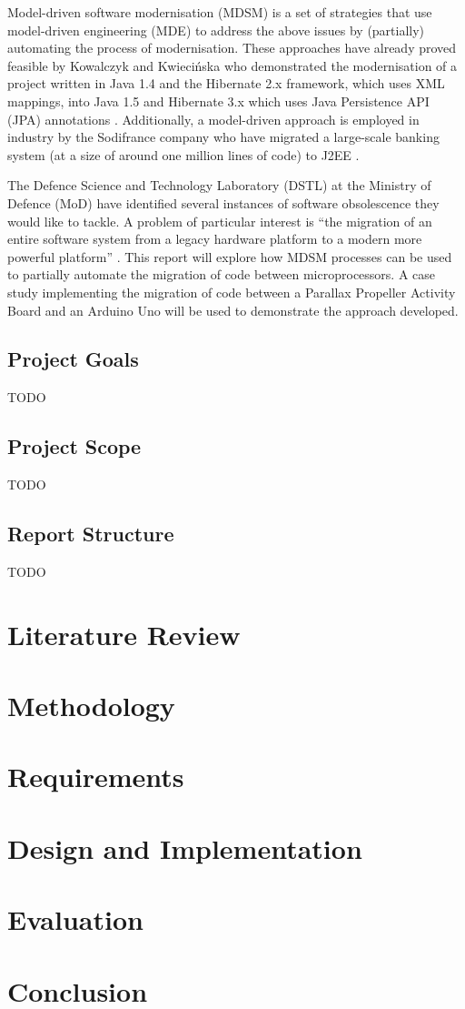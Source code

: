 \documentclass{UoYCSproject}
\begin{document}
Model-driven software modernisation (MDSM) is a set of strategies that use model-driven engineering (MDE) to address the above issues by (partially) automating the process of modernisation. These approaches have already proved feasible by Kowalczyk and Kwieci\'nska who demonstrated the modernisation of a project written in Java 1.4 and the Hibernate 2.x framework, which uses XML mappings, into Java 1.5 and Hibernate 3.x which uses Java Persistence API (JPA) annotations \parencite{kowalczyk2009model}. Additionally, a model-driven approach is employed in industry by the Sodifrance company who have migrated a large-scale banking system (at a size of around one million lines of code) to J2EE \parencite{fleurey2007model}.

The Defence Science and Technology Laboratory (DSTL) at the Ministry of Defence (MoD) have identified several instances of software obsolescence they would like to tackle. A problem of particular interest is ``the migration of an entire software system from a legacy hardware platform to a modern more powerful platform'' \parencite{gerasimou2017technical}. This report will explore how MDSM processes can be used to partially automate the migration of code between microprocessors. A case study implementing the migration of code between a Parallax Propeller Activity Board and an Arduino Uno will be used to demonstrate the approach developed.
 
\section{Project Goals}
TODO
\section{Project Scope}
TODO
\section{Report Structure}
TODO

\chapter{Literature Review}

\chapter{Methodology}

\chapter{Requirements}

\chapter{Design and Implementation}

\chapter{Evaluation}

\chapter{Conclusion}

\printbibliography
\end{document}
